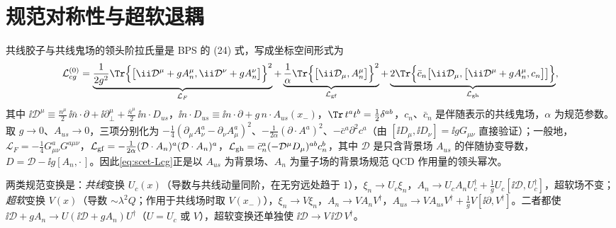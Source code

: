 \section{规范对称性与超软退耦}\label{sec:scet-decoupling}

共线胶子与共线鬼场的领头阶拉氏量是 BPS 的 (24) 式\cite{BauerPirjolStewart2002}，写成坐标空间形式为
\begin{equation}\label{eq:scet-Lcg}
\mathcal L^{(0)}_{cg}=\underbrace{\frac{1}{2g^2}\Tr\Big\{\big[\ii\mathcal D^\mu+gA_n^\mu,\ii\mathcal D^\nu+gA_n^\nu\big]\Big\}^2}_{\mathcal L_F}
+\underbrace{\frac1\alpha\Tr\Big\{\big[\ii\mathcal D_\mu,A_n^\mu\big]\Big\}^2}_{\mathcal L_{\rm gf}}
+\underbrace{2\Tr\Big\{\bar c_n\big[\ii\mathcal D_\mu,\big[\ii\mathcal D^\mu+gA_n^\mu,c_n\big]\big]\Big\}}_{\mathcal L_{\rm gh}},
\end{equation}
其中 $\ii\mathcal D^\mu\equiv\frac{n^\mu}{2}\,\ii\bar n\cdot\partial+\ii\partial_\perp^\mu+\frac{\bar n^\mu}{2}\,\ii n\cdot D_{us}$，$\ii n\cdot D_{us}\equiv\ii n\cdot\partial+g\,n\cdot A_{us}(x_-)$，$\Tr\,t^at^b=\frac12\delta^{ab}$，$c_n$、$\bar c_n$ 是伴随表示的共线鬼场，$\alpha$ 为规范参数。取 $g\to0$、$A_{us}\to0$，三项分别化为 $-\frac14(\partial_\mu A^a_\nu-\partial_\nu A^a_\mu)^2$、$-\frac1{2\alpha}(\partial\cdot A^a)^2$、$-\bar c^a\partial^2c^a$（由 $[\ii D_\mu,\ii D_\nu]=\ii gG_{\mu\nu}$ 直接验证）；一般地，$\mathcal L_F=-\frac14G^a_{\mu\nu}G^{a\mu\nu}$，$\mathcal L_{\rm gf}=-\frac{1}{2\alpha}(\mathcal D\cdot A_n)^a(\mathcal D\cdot A_n)^a$，$\mathcal L_{\rm gh}=\bar c_n^a(-\mathcal D^\mu D_{\mu})^{ab}c_n^b$，其中 $\mathcal D$ 是只含背景场 $A_{us}$ 的伴随协变导数，$D=\mathcal D-\ii g[A_n,\cdot\,]$。因此\cref{eq:scet-Lcg}正是以 $A_{us}$ 为背景场、$A_n$ 为量子场的背景场规范 QCD 作用量的领头幂次\cite{BauerPirjolStewart2002}。%

两类规范变换是：\emph{共线}变换 $U_c(x)$（导数与共线动量同阶，在无穷远处趋于 $1$），$\xi_n\to U_c\xi_n$，$A_n\to U_cA_nU_c^\dagger+\frac1gU_c[\ii\mathcal D,U_c^\dagger]$，超软场不变；\emph{超软}变换 $V(x)$（导数 $\sim\lambda^2Q$；作用于共线场时取 $V(x_-)$），$\xi_n\to V\xi_n$，$A_n\to VA_nV^\dagger$，$A_{us}\to VA_{us}V^\dagger+\frac1gV[\ii\partial,V^\dagger]$。二者都使 $\ii\mathcal D+gA_n\to U(\ii\mathcal D+gA_n)U^\dagger$（$U=U_c$ 或 $V$），超软变换还单独使 $\ii\mathcal D\to V\,\ii\mathcal D\,V^\dagger$。

